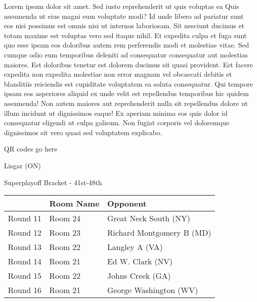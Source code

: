 \documentclass{article}%
\begin{document}
\vspace*{8pt}%
\linebreak%
\newline%
\newline%
    Lorem ipsum dolor sit amet. Sed iusto reprehenderit ut quis voluptas ea Quis assumenda ut eius magni eum voluptate modi? Id unde libero ad pariatur sunt eos nisi possimus est omnis nisi ut internos laboriosam. Sit nesciunt ducimus et totam maxime est voluptas vero sed itaque nihil. Et expedita culpa et fuga sunt quo esse ipsam eos doloribus autem rem perferendis modi et molestiae vitae.\newline%
\newline%
    Sed cumque odio eum temporibus deleniti ad consequatur consequatur aut molestias maiores. Est doloribus tenetur est dolorem ducimus sit quasi provident. Est facere expedita non expedita molestiae non error magnam vel obcaecati debitis et blanditiis reiciendis est cupiditate voluptatem ea soluta consequatur. Qui tempore ipsam eos asperiores aliquid ex unde velit est repellendus temporibus hic quidem assumenda!\newline%
\newline%
    Non autem maiores aut reprehenderit nulla sit repellendus dolore ut illum incidunt ut dignissimos eaque! Ex aperiam minima eos quis dolor id consequatur eligendi ut culpa galisum. Non fugiat corporis vel doloremque dignissimos sit vero quasi sed voluptatem explicabo.\newline%
\newline%
\vspace*{30pt}%
\begin{center}%
\begin{Huge}%
QR codes go here%
\end{Huge}%
\end{center}%
\newpage%
\begin{center}%
\begin{Huge}%
Lisgar (ON)%
\end{Huge}%
\vspace*{8pt}%
\linebreak%
\begin{Large}%
Superplayoff Bracket {-} 41st{-}48th%
\end{Large}%
\end{center}%
%
\begin{tabularx}{\textwidth}{|c|Y|Y|}%
\hline%
&Room Name&Opponent\\%
\hline%
Round 11&Room 24&Great Neck South (NY)\\%
Round 12&Room 23&Richard Montgomery B (MD)\\%
Round 13&Room 22&Langley A (VA)\\%
Round 14&Room 21&Ed W. Clark (NV)\\%
Round 15&Room 22&Johns Creek (GA)\\%
Round 16&Room 21&George Washington (WV)\\%
\hline%
\end{tabularx}%
\end{document}
